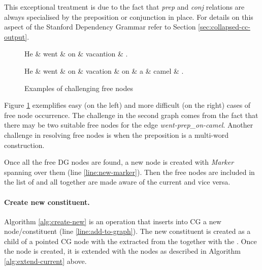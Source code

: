     This exceptional treatment is due to the fact that \textit{prep} and \textit{conj} relations are always specialised by the preposition or conjunction in place. For details on this aspect of the Stanford Dependency Grammar refer to Section \ref{sec:collapsed-cc-output}.

    \begin{figure}[!ht]
    \centering
    \begin{minipage}[b]{0.35\textwidth}
    \centering
    	\begin{dependency}
    		\begin{deptext}[]
    	He \& went \& on \& vacantion \& . \\
    		\end{deptext}
    	\end{dependency}
    \end{minipage}
    \begin{minipage}[b]{0.55\textwidth}
    	\begin{dependency}
    		\begin{deptext}[]
    	He \& went \& on \& vacation \& on \& a \& camel \& . \\
    		\end{deptext}
    	\end{dependency}
    \end{minipage}
    \caption{Examples of challenging free nodes}
    \label{fig:challenging-free-nodes}
    \end{figure}

    Figure \ref{fig:challenging-free-nodes} exemplifies easy (on the left) and more difficult (on the right) cases of free node occurrence. The challenge in the second graph comes from the fact that there may be two suitable free nodes for the edge \textit{went-\mbox{prep\_on}-camel}. Another challenge in resolving free nodes is when the preposition is a multi-word construction. 

    Once all the free DG nodes are found, a new \cg node is created with \textit{Marker} \elementType spanning over them (line \ref{line:new-marker}). Then the free nodes are included in the list of \Children and all together are made aware of the current \cgPointer and vice versa. 

    \paragraph{Create new constituent.} Algorithm \ref{alg:create-new} is an operation that inserts into CG a new node/constituent (line \ref{line:add-to-graph}). The new constituent is created as a child of a pointed CG node with the \elementType extracted from the \rt together with the \operation. Once the \cg node is created, it is extended with the \Children nodes as described in Algorithm \ref{alg:extend-current} above.

